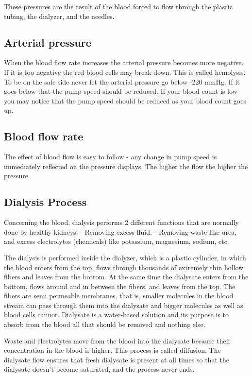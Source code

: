 \documentclass[
  11pt,
  letterpaper,
  DIV=11,
  numbers=noendperiod]{scrreprt}
\begin{document}
These pressures are the result of the blood forced to flow through the
plastic tubing, the dialyzer, and the needles.

\subsection{Arterial pressure}\label{arterial-pressure}

When the blood flow rate increases the arterial pressure becomes more
negative. If it is too negative the red blood cells may break down. This
is called hemolysis. To be on the safe side never let the arterial
pressure go below -220 mmHg. If it goes below that the pump speed should
be reduced. If your blood count is low you may notice that the pump
speed should be reduced as your blood count goes up.

\subsection{Blood flow rate}\label{blood-flow-rate}

The effect of blood flow is easy to follow - any change in pump speed is
immediately reflected on the pressure displays. The higher the flow the
higher the pressure.

\subsection{Dialysis Process}\label{dialysis-process}

Concerning the blood, dialysis performs 2 different functions that are
normally done by healthy kidneys: - Removing excess fluid. - Removing
waste like urea, and excess electrolytes (chemicals) like potassium,
magnesium, sodium, etc.

The dialysis is performed inside the dialyzer, which is a plastic
cylinder, in which the blood enters from the top, flows through
thousands of extremely thin hollow fibers and leaves from the bottom. At
the same time the dialysate enters from the bottom, flows around and in
between the fibers, and leaves from the top. The fibers are semi
permeable membranes, that is, smaller molecules in the blood stream can
pass through them into the dialysate and bigger molecules as well as
blood cells cannot. Dialysate is a water-based solution and its purpose
is to absorb from the blood all that should be removed and nothing else.

Waste and electrolytes move from the blood into the dialysate because
their concentration in the blood is higher. This process is called
diffusion. The dialysate flow ensures that fresh dialysate is present at
all times so that the dialysate doesn't become saturated, and the
process never ends.
\end{document}
